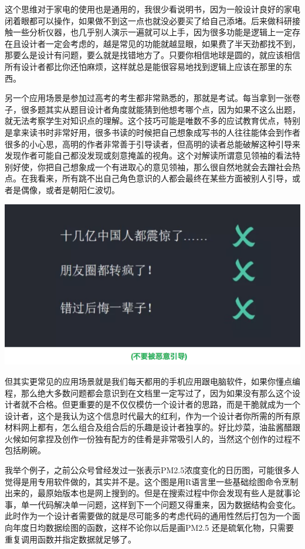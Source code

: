 \documentclass[]{book}
\begin{document}
这个思维对于家电的使用也是通用的，我很少看说明书，因为一般设计良好的家电闭着眼都可以操作，如果做不到这一点也就没必要买了给自己添堵。后来做科研接触一些分析仪器，也几乎别人演示一遍就可以上手，因为很多功能是逻辑上一定存在且设计者一定会考虑的，越是常见的功能就越显眼，如果费了半天劲都找不到，那要么是设计有问题，要么就是找错地方了。只要你相信地球是圆的，就应该相信所有设计者都比你还怕麻烦，这样就总是能很容易地找到逻辑上应该在那里的东西。

另一个应用场景是参加过高考的考生都非常熟悉的，那就是考试。每当拿到一张卷子，很多题其实从题目设计者角度就能猜到他想考哪个点，因为如果不这么出题，就无法考察学生对知识点的理解。这个技巧可能是唯数不多的应试教育优点，特别是拿来读书时非常好用，很多书读的时候把自己想象成写书的人往往能体会到作者很多的小心思，高明的作者非常善于引导读者，但高明的读者总能破解这种引导来发现作者可能自己都没发现或刻意掩盖的视角。这个对解读所谓意见领袖的看法特别好使，你把自己想象成一个有进取心的意见领袖，那么很自然地就会去蹭社会热点。在我看来，所有跳不出自己角色意识的人都会最终在某些方面被别人引导，或者是偶像，或者是朝阳仁波切。

\includegraphics[width=8.33in]{images/sheji4}

但其实更常见的应用场景就是我们每天都用的手机应用跟电脑软件，如果你懂点编程，那么绝大多数问题都会意识到在文档里一定写过了，因为如果没有那么这个设计者就不合格。但更重要的是不仅仅模仿一个设计者的思路，而是干脆就成为一个设计者，这个是我认为这个信息时代最大的红利，作为一个设计者你所需的所有原材料网上都有，怎么组合及组合后的乐趣是设计者独享的。好比炒菜，油盐酱醋跟火候如何拿捏及创作一份独有配方的佳肴是非常吸引人的，当然这个创作的过程不包括刷碗。

我举个例子，之前公众号曾经发过一张表示PM2.5浓度变化的日历图，可能很多人觉得是用专用软件做的，其实并不是。这个图是用R语言里一些基础绘图命令烹制出来的，最原始版本也是网上搜到的。但是在搜索过程中你会发现有些人是就事论事，单一代码解决单一问题，这样到下一个问题又得重来，因为数据结构会变化。此时作为一个设计者需要做的就是尽可能多的考虑代码的通用性然后打包为一个面向年度日均数据绘图的函数，这样不论你以后是画PM2.5
还是硫氧化物，只需要重复调用函数并指定数据就足够了。
\end{document}
